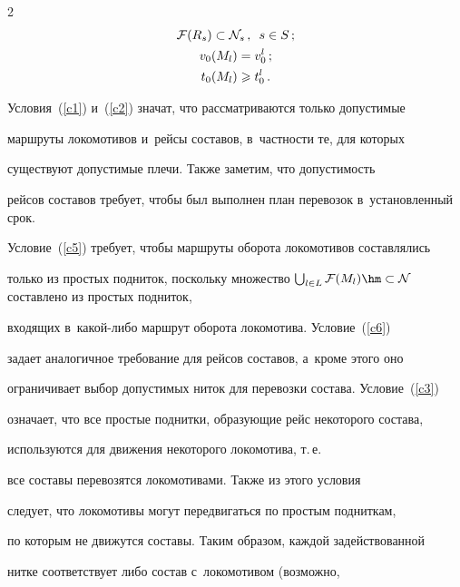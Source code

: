 \begin{multicols}{2}
\begin{gather}
    \label{c6}


        \mathcal F(R_s) \subset \mathcal N_s\,,\enskip s\in S\,;\\


    \label{c7}


        v_0(M_l) = v_0^l\,;\\


    \label{c8}


        t_0(M_l) \geqslant t_0^l\,.


\end{gather}





Условия~(\ref{c1}) и~(\ref{c2}) значат, что рассматриваются только допустимые 


маршруты локомотивов и~рейсы составов, в~частности те, для которых 


существуют допустимые плечи. Также заметим, что допустимость 


рейсов составов требует, чтобы был выполнен план перевозок в~установленный срок.





Условие~(\ref{c5}) требует, чтобы маршруты оборота локомотивов составлялись 


только из простых подниток, поскольку множество $\bigcup\nolimits_{l\in L} 


\mathcal F(M_l)\hm \subset \mathcal N$ со\-став\-ле\-но из простых подниток, 


входящих в~ка\-кой-ли\-бо маршрут оборота локомотива. Условие~(\ref{c6})\linebreak 


задает аналогичное требование для рейсов составов, а~кроме этого оно 


ограничивает выбор допустимых ниток для перевозки состава. Условие~(\ref{c3}) 


означает, что все простые поднитки, образующие рейс некоторого состава, 


используются для движения некоторого локомотива, т.\,е.\


 все составы перевозятся локомотивами. Также из этого условия 


 следует, что локомотивы могут передвигаться по простым подниткам, 


 по которым не движутся составы. Таким образом, каждой задействованной 


 нитке со\-от\-вет\-ст\-ву\-ет либо состав с~локомотивом (возможно, 



\end{multicols}
